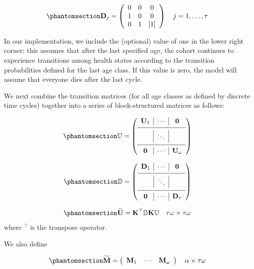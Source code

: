 \documentclass[
]{agujournal2019}
\begin{document}
\begin{equation}\phantomsection\label{eq-D}{
\mathbf{D}_j=\left(\begin{array}{ccc}
0 & 0 & 0 \\
1 & 0 & 0 \\
0 & 1 & {[1]}
\end{array}\right) \quad j=1, \ldots, \tau
}\end{equation}

In our implementation, we include the (optional) value of one in the
lower right corner; this assumes that after the last specified age, the
cohort continues to experience transitions among health states according
to the transition probabilities defined for the last age class. If this
value is zero, the model will assume that everyone dies after the last
cycle.

We next combine the transition matrices (for all age classes as defined
by discrete time cycles) together into a series of block-structured
matrices as follows:

\begin{equation}\phantomsection\label{eq-bbU}{
\mathbb{U}=\left(\begin{array}{c|c|c}
\mathbf{U}_1 & \cdots & \mathbf{0} \\
\hline & \ddots & \\
\hline \mathbf{0} & \cdots & \mathbf{U}_\omega
\end{array}\right)
}\end{equation}

\begin{equation}\phantomsection\label{eq-BBD}{
\mathbb{D}=\left(\begin{array}{c|c|c}
\mathbf{D}_1 & \cdots & \mathbf{0} \\
\hline & \ddots & \\
\hline \mathbf{0} & \cdots & \mathbf{D}_\tau
\end{array}\right)
}\end{equation}

\begin{equation}\phantomsection\label{eq-Utilde}{
\widetilde{\mathbf{U}}=\mathbf{K}^{\top} \mathbb{D} \mathbf{K} \mathbb{U} \quad \tau \omega \times \tau \omega
}\end{equation} where \(^\top\) is the transpose operator.

We also define

\begin{equation}\phantomsection\label{eq-Mtilde}{
\widetilde{\mathbf{M}}=\left(\begin{array}{lll}
\mathbf{M}_1 & \cdots & \mathbf{M}_\omega
\end{array}\right) \quad \alpha \times \tau \omega
}\end{equation}
\end{document}
